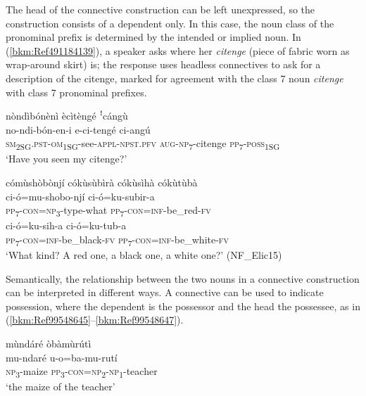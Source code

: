 The head of the connective construction can be left unexpressed, so the construction consists of a dependent only. In this case, the noun class of the pronominal prefix is determined by the intended or implied noun. In (\ref{bkm:Ref491184139}), a speaker asks where her \textit{citenge} (piece of fabric worn as wrap-around skirt) is; the response uses headless connectives to ask for a description of the citenge, marked for agreement with the class 7 noun \textit{citenge} with class 7 pronominal prefixes.

\ea
\label{bkm:Ref491184139}
\ea
nòndìbónènì ècìtèngé ꜝcángù\\
\gll no-ndi-bón-en-i        e-ci-tengé    ci-angú\\
\textsc{sm}\textsubscript{2SG}.\textsc{pst}-\textsc{om}\textsubscript{1SG}-see-\textsc{appl}-\textsc{npst}.\textsc{pfv}  \textsc{aug}-\textsc{np}\textsubscript{7}-citenge  \textsc{pp}\textsubscript{7}-\textsc{poss}\textsubscript{1SG}\\
\glt ‘Have you seen my citenge?’

\ex
cómùshòbònjí cókùsùbìrà cókùsìhà cókùtùbà\\
\gll ci-ó=mu-shobo-njí    ci-ó=ku-subir-a\\
\textsc{pp}\textsubscript{7}-\textsc{con}=\textsc{np}\textsubscript{3}-type-what  \textsc{pp}\textsubscript{7}-\textsc{con}=\textsc{inf}-be\_red-\textsc{fv}\\
ci-ó=ku-sih-a     ci-ó=ku-tub-a\\
\textsc{pp}\textsubscript{7}-\textsc{con}=\textsc{inf}-be\_black-\textsc{fv}  \textsc{pp}\textsubscript{7}-\textsc{con}=\textsc{inf}-be\_white-\textsc{fv}\\
\glt ‘What kind? A red one, a black one, a white one?’ (NF\_Elic15)
\z\z

Semantically, the relationship between the two nouns in a connective construction can be interpreted in different ways. A connective can be used to indicate possession, where the dependent is the possessor and the head the possessee, as in (\ref{bkm:Ref99548645}--\ref{bkm:Ref99548647}).

\ea
\label{bkm:Ref99548645}
mùndáré òbàmùrútì\\
\gll mu-ndaré  u-o=ba-mu-rutí\\
\textsc{np}\textsubscript{3}-maize  \textsc{pp}\textsubscript{3}-\textsc{con}=\textsc{np}\textsubscript{2}-\textsc{np}\textsubscript{1}-teacher\\
\glt ‘the maize of the teacher’
\z


